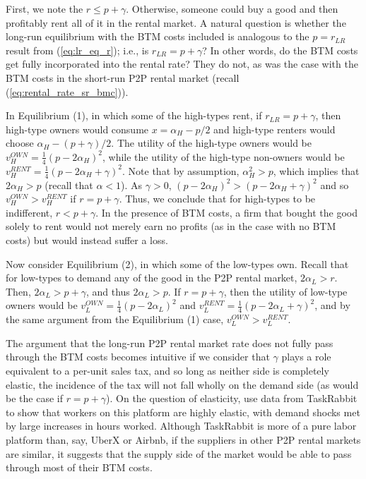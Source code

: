 \documentclass[11pt]{article}
\begin{document}
First, we note the $r \le p + \gamma$.
Otherwise, someone could buy a good and then profitably rent all of it in the rental market.
A natural question is whether the long-run equilibrium with the BTM costs included is analogous to the $p = r_{LR}$ result from (\ref{eq:lr_eq_r}); i.e., is $r_{LR} = p + \gamma$? 
In other words, do the BTM costs get fully incorporated into the rental rate?
They do not, as was the case with the BTM costs in the short-run P2P rental market (recall (\ref{eq:rental_rate_sr_bmc})). 

In Equilibrium (1), in which some of the high-types rent, if $r_{LR} = p + \gamma$,  then high-type owners would consume $x = \alpha_H - p/2$ and high-type renters would choose $\alpha_H - (p + \gamma)/2$.
The utility of the high-type owners would be $v_H^{OWN} = \frac{1}{4}(p - 2\alpha_H)^2$, while the utility of the high-type non-owners would be $v_H^{RENT} = \frac{1}{4} \left(p - 2\alpha_H + \gamma \right)^2$.
Note that by assumption, $\alpha_H^2 > p$, which implies that $2 \alpha_H > p$ (recall that $\alpha < 1$).
As $\gamma > 0$, $(p - 2\alpha_H)^2 > (p - 2\alpha_H + \gamma)^2$ and so $v_H^{OWN} > v_H^{RENT}$ if $r = p + \gamma$.
Thus, we conclude that for high-types to be indifferent, $r < p + \gamma$.
In the presence of BTM costs, a firm that bought the good solely to rent would not merely earn no profits (as in the case with no BTM costs) but would instead suffer a loss. 

Now consider Equilibrium (2), in which some of the low-types own.
Recall that for low-types to demand any of the good in the P2P rental market, $2\alpha_L > r$. 
Then, $2\alpha_L > p + \gamma$, and thus $2\alpha_L > p$.
If $r = p + \gamma$, then the utility of low-type owners would be $v_L^{OWN} = \frac{1}{4}(p - 2\alpha_L)^2$ and $v_L^{RENT} = \frac{1}{4}(p - 2\alpha_L + \gamma)^2$, and by the same argument from the Equilibrium (1) case, $v_L^{OWN} > v_L^{RENT}$. 

The argument that the long-run P2P rental market rate does not fully pass through the BTM costs becomes intuitive if we consider that $\gamma$ plays a role equivalent to a per-unit sales tax, and so long as neither side is completely elastic, the incidence of the tax will not fall wholly on the demand side (as would be the case if $r = p + \gamma$). 
On the question of elasticity, \cite{cullen2014outsourcing} use data from TaskRabbit to show that workers on this platform are highly elastic, with demand shocks met by large increases in hours worked.
Although TaskRabbit is more of a pure labor platform than, say, UberX or Airbnb, if the suppliers in other P2P rental markets are similar, it suggests that the supply side of the market would be able to pass through most of their BTM costs. 
\end{document}
